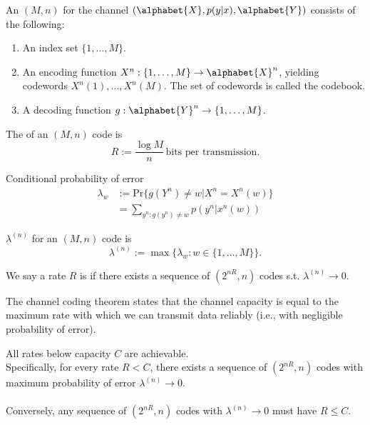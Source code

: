 \begin{definition}
An $(M,n)$  for the channel $(\alphabet{X}, p(y|x), \alphabet{Y})$ consists of the following:
\begin{enumerate}
	\item An index set $\{1,\ldots,M\}$.
	
	\item An encoding function $X^n : \{1,\ldots,M\} \to \alphabet{X}^n$, yielding codewords $X^n(1), \ldots, X^n(M)$. The set of codewords is called the codebook.
	
	\item A decoding function $g: \alphabet{Y}^n \to \{1,\ldots,M\}$.
\end{enumerate}
\end{definition}

The  of an $(M,n)$ code is
$$
	R := \frac{\log M}{n} \, \text{bits per transmission.}
$$



\begin{definition}
Conditional probability of error 
\begin{align*}
	\lambda_w &:= \mathrm{Pr}\{g(Y^n) \ne w | X^n = X^n(w)\}\\
	&= \sum_{y^n : g(y^n) \ne w} p(y^n | x^n(w))
\end{align*}

 $\lambda^{(n)}$ for an $(M,n)$ code is 
$$
	\lambda^{(n)} := \max \{\lambda_w : w \in \{1,\ldots,M\} \}.
$$
\end{definition}

We say a rate $R$ is  if there exists a sequence of $(2^{nR}, n)$ codes s.t. $\lambda^{(n)} \to 0$.



The channel coding theorem states that the channel capacity is equal to the maximum rate with which we can transmit data reliably (i.e., with negligible probability of error).

\begin{theorem}
All rates below capacity $C$ are achievable.\\
Specifically, for every rate $R < C$, there exists a sequence of $(2^{nR}, n)$ codes with maximum probability of error $\lambda^{(n)} \to 0$.\\
~\\
Conversely, any sequence of $(2^{nR}, n)$ codes with $\lambda^{(n)} \to 0$ must have $R \le C$.
\end{theorem}









